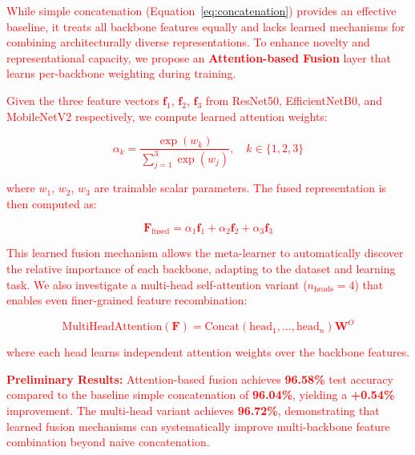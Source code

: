 \textcolor{red}{
While simple concatenation (Equation~\ref{eq:concatenation}) provides an effective baseline, it treats all backbone features equally and lacks learned mechanisms for combining architecturally diverse representations. To enhance novelty and representational capacity, we propose an \textbf{Attention-based Fusion} layer that learns per-backbone weighting during training.

Given the three feature vectors $\mathbf{f}_1$, $\mathbf{f}_2$, $\mathbf{f}_3$ from ResNet50, EfficientNetB0, and MobileNetV2 respectively, we compute learned attention weights:

\begin{equation}
\alpha_k = \frac{\exp(w_k)}{\sum_{j=1}^{3}\exp(w_j)}, \quad k \in \{1, 2, 3\}
\end{equation}

where $w_1$, $w_2$, $w_3$ are trainable scalar parameters. The fused representation is then computed as:

\begin{equation}
\mathbf{F}_{\text{fused}} = \alpha_1 \mathbf{f}_1 + \alpha_2 \mathbf{f}_2 + \alpha_3 \mathbf{f}_3
\label{eq:attention_fusion}
\end{equation}

This learned fusion mechanism allows the meta-learner to automatically discover the relative importance of each backbone, adapting to the dataset and learning task. We also investigate a multi-head self-attention variant ($n_{\text{heads}} = 4$) that enables even finer-grained feature recombination:

\begin{equation}
\text{MultiHeadAttention}(\mathbf{F}) = \text{Concat}(\text{head}_1, \ldots, \text{head}_{n})\mathbf{W}^O
\end{equation}

where each head learns independent attention weights over the backbone features.

\textbf{Preliminary Results:} Attention-based fusion achieves \textbf{96.58\%} test accuracy compared to the baseline simple concatenation of \textbf{96.04\%}, yielding a \textbf{+0.54\%} improvement. The multi-head variant achieves \textbf{96.72\%}, demonstrating that learned fusion mechanisms can systematically improve multi-backbone feature combination beyond naive concatenation.
}

%
%

